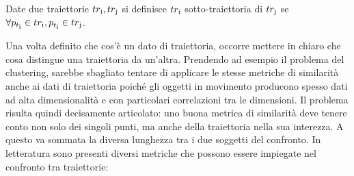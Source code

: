 \begin{definition}

  Date due traiettorie \(tr\textsubscript{i}, tr\textsubscript{j}\) si definisce  \(tr\textsubscript{i}\) sotto-traiettoria di \(tr\textsubscript{j}\) se \(\forall p_{t\textsubscript{i}} \in tr\textsubscript{i}, p_{t\textsubscript{i}} \in tr\textsubscript{j}\).

\end{definition}

Una volta definito che cos'è un dato di traiettoria, occorre mettere in chiaro che cosa distingue una traiettoria da un'altra.
Prendendo ad esempio il problema del clustering, sarebbe sbagliato tentare di applicare le stesse metriche di similarità anche ai dati di traiettoria
poiché gli oggetti in movimento producono spesso dati ad alta dimensionalità e con particolari correlazioni tra le dimensioni.
Il problema risulta quindi decisamente articolato: uno buona metrica di similarità deve tenere conto non solo dei singoli punti, ma anche della
traiettoria nella sua interezza.
A questo va sommata la diversa lunghezza tra i due soggetti del confronto.
In letteratura sono presenti diversi metriche che possono essere impiegate nel confronto tra traiettorie:

